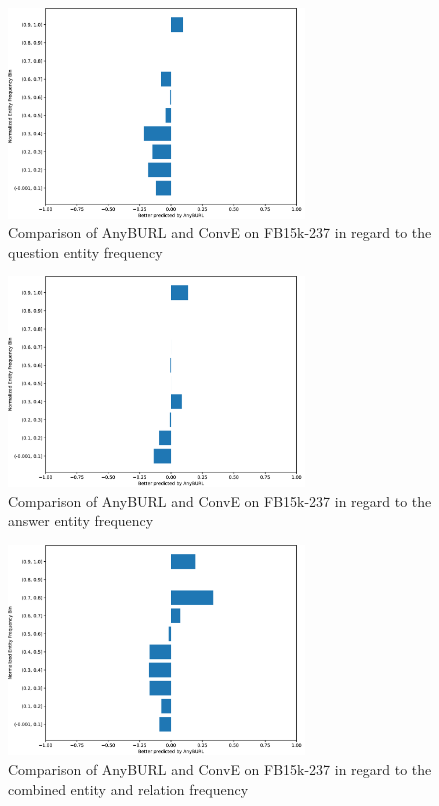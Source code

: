\begin{figure}[H]
\centering
\includegraphics[width=0.7\textwidth]{images/entity_freq_question_anyburl_conve_fb15k.PNG}
\caption{Comparison of AnyBURL and ConvE on FB15k-237 in regard to the question entity frequency}
\label{fig:entity_question_tail_anyburl_conve_fb15k}
\end{figure}

\begin{figure}[H]
\centering
\includegraphics[width=0.7\textwidth]{images/entity_freq_answer_anyburl_conve_fb15k.PNG}
\caption{Comparison of AnyBURL and ConvE on FB15k-237 in regard to the answer entity frequency}
\label{fig:entity_answer_tail_anyburl_conve_fb15k}
\end{figure}

\begin{figure}[H]
\centering
\includegraphics[width=0.7\textwidth]{images/combined_freq_anyburl_conve_fb15k.PNG}
\caption{Comparison of AnyBURL and ConvE on FB15k-237 in regard to the combined entity and relation frequency}
\label{fig:combined_freq_anyburl_conve_fb15k}
\end{figure}




